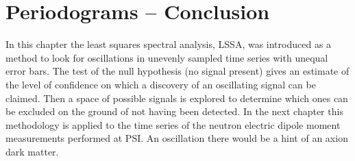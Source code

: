\section*{Periodograms -- Conclusion}
In this chapter the least squares spectral analysis, LSSA, was introduced as a method to look for oscillations in unevenly sampled time series with unequal error bars.
The test of the null hypothesis (no signal present) gives an estimate of the level of confidence on which a discovery of an oscillating signal can be claimed.
Then a space of possible signals is explored to determine which ones can be excluded on the ground of not having been detected.
In the next chapter this methodology is applied to the time series of the neutron electric dipole moment measurements performed at PSI\@.
An oscillation there would be a hint of an axion dark matter.
